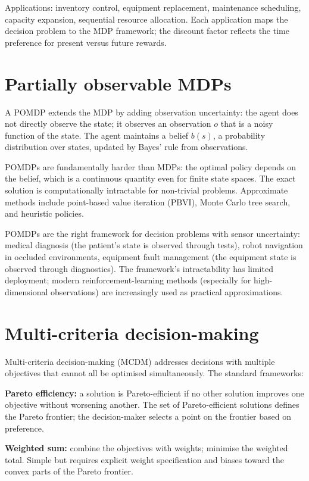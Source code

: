 Applications: inventory control, equipment replacement, maintenance scheduling, capacity expansion, sequential resource allocation. Each application maps the decision problem to the MDP framework; the discount factor reflects the time preference for present versus future rewards.

\section{Partially observable MDPs}

A POMDP extends the MDP by adding observation uncertainty: the agent does not directly observe the state; it observes an observation $o$ that is a noisy function of the state. The agent maintains a belief $b(s)$, a probability distribution over states, updated by Bayes' rule from observations.

POMDPs are fundamentally harder than MDPs: the optimal policy depends on the belief, which is a continuous quantity even for finite state spaces. The exact solution is computationally intractable for non-trivial problems. Approximate methods include point-based value iteration (PBVI), Monte Carlo tree search, and heuristic policies.

POMDPs are the right framework for decision problems with sensor uncertainty: medical diagnosis (the patient's state is observed through tests), robot navigation in occluded environments, equipment fault management (the equipment state is observed through diagnostics). The framework's intractability has limited deployment; modern reinforcement-learning methods (especially for high-dimensional observations) are increasingly used as practical approximations.

\section{Multi-criteria decision-making}

Multi-criteria decision-making (MCDM) addresses decisions with multiple objectives that cannot all be optimised simultaneously. The standard frameworks:

\textbf{Pareto efficiency:} a solution is Pareto-efficient if no other solution improves one objective without worsening another. The set of Pareto-efficient solutions defines the Pareto frontier; the decision-maker selects a point on the frontier based on preference.

\textbf{Weighted sum:} combine the objectives with weights; minimise the weighted total. Simple but requires explicit weight specification and biases toward the convex parts of the Pareto frontier.

